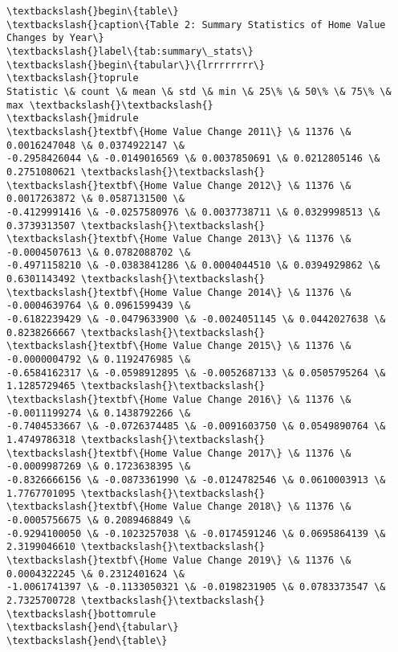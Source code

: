 \documentclass[11pt]{article}
\begin{document}
    \begin{Verbatim}[commandchars=\\\{\}]
\textbackslash{}begin\{table\}
\textbackslash{}caption\{Table 2: Summary Statistics of Home Value Changes by Year\}
\textbackslash{}label\{tab:summary\_stats\}
\textbackslash{}begin\{tabular\}\{lrrrrrrrr\}
\textbackslash{}toprule
Statistic \& count \& mean \& std \& min \& 25\% \& 50\% \& 75\% \& max \textbackslash{}\textbackslash{}
\textbackslash{}midrule
\textbackslash{}textbf\{Home Value Change 2011\} \& 11376 \& 0.0016247048 \& 0.0374922147 \&
-0.2958426044 \& -0.0149016569 \& 0.0037850691 \& 0.0212805146 \& 0.2751080621 \textbackslash{}\textbackslash{}
\textbackslash{}textbf\{Home Value Change 2012\} \& 11376 \& 0.0017263872 \& 0.0587131500 \&
-0.4129991416 \& -0.0257580976 \& 0.0037738711 \& 0.0329998513 \& 0.3739313507 \textbackslash{}\textbackslash{}
\textbackslash{}textbf\{Home Value Change 2013\} \& 11376 \& -0.0004507613 \& 0.0782088702 \&
-0.4971158210 \& -0.0383841286 \& 0.0004044510 \& 0.0394929862 \& 0.6301143492 \textbackslash{}\textbackslash{}
\textbackslash{}textbf\{Home Value Change 2014\} \& 11376 \& -0.0004639764 \& 0.0961599439 \&
-0.6182239429 \& -0.0479633900 \& -0.0024051145 \& 0.0442027638 \& 0.8238266667 \textbackslash{}\textbackslash{}
\textbackslash{}textbf\{Home Value Change 2015\} \& 11376 \& -0.0000004792 \& 0.1192476985 \&
-0.6584162317 \& -0.0598912895 \& -0.0052687133 \& 0.0505795264 \& 1.1285729465 \textbackslash{}\textbackslash{}
\textbackslash{}textbf\{Home Value Change 2016\} \& 11376 \& -0.0011199274 \& 0.1438792266 \&
-0.7404533667 \& -0.0726374485 \& -0.0091603750 \& 0.0549890764 \& 1.4749786318 \textbackslash{}\textbackslash{}
\textbackslash{}textbf\{Home Value Change 2017\} \& 11376 \& -0.0009987269 \& 0.1723638395 \&
-0.8326666156 \& -0.0873361990 \& -0.0124782546 \& 0.0610003913 \& 1.7767701095 \textbackslash{}\textbackslash{}
\textbackslash{}textbf\{Home Value Change 2018\} \& 11376 \& -0.0005756675 \& 0.2089468849 \&
-0.9294100050 \& -0.1023257038 \& -0.0174591246 \& 0.0695864139 \& 2.3199046610 \textbackslash{}\textbackslash{}
\textbackslash{}textbf\{Home Value Change 2019\} \& 11376 \& 0.0004322245 \& 0.2312401624 \&
-1.0061741397 \& -0.1133050321 \& -0.0198231905 \& 0.0783373547 \& 2.7325700728 \textbackslash{}\textbackslash{}
\textbackslash{}bottomrule
\textbackslash{}end\{tabular\}
\textbackslash{}end\{table\}

    \end{Verbatim}
\end{document}
